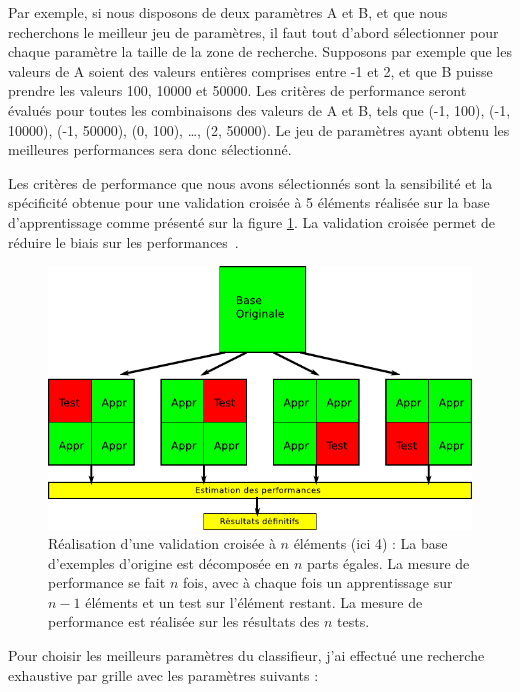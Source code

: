 Par exemple, si nous disposons de deux paramètres A et B, et que nous recherchons le meilleur jeu de paramètres, il faut tout d'abord sélectionner pour chaque paramètre la taille de la zone de recherche. Supposons par exemple que les valeurs de A soient des valeurs entières comprises entre -1 et 2, et que B puisse prendre les valeurs 100, 10000 et 50000. Les critères de performance seront évalués pour toutes les combinaisons des valeurs de A et B, tels que (-1, 100), (-1, 10000), (-1, 50000), (0, 100), \dots, (2, 50000). Le jeu de paramètres ayant obtenu les meilleures performances sera donc sélectionné. 

Les critères de performance que nous avons sélectionnés sont la sensibilité et la spécificité obtenue pour une validation croisée à 5 éléments réalisée sur la base d'apprentissage comme présenté sur la figure \ref{fig:crossValid}. La validation croisée permet de réduire le biais sur les performances~\cite{varma2006bias}.

\begin{figure}[h!]
 \includegraphics[width=15cm]{images/crossValid}
 \caption[Réalisation d'une validation croisée à $n$ éléments]{Réalisation d'une validation croisée à $n$ éléments (ici 4) : La base d'exemples d'origine est décomposée en $n$ parts égales. La mesure de performance se fait $n$ fois, avec à chaque fois un apprentissage sur $n-1$ éléments et un test sur l'élément restant. La mesure de performance est réalisée sur les résultats des $n$ tests.}
 \label{fig:crossValid}
\end{figure}


Pour choisir les meilleurs paramètres du classifieur, j'ai effectué une recherche exhaustive par grille avec les paramètres suivants :

